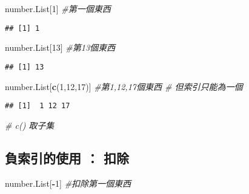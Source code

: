 \documentclass[]{article}
\newenvironment{Shaded}{\begin{snugshade}}{\end{snugshade}}
\newcommand{\CommentTok}[1]{\textcolor[rgb]{0.56,0.35,0.01}{\textit{#1}}}
\newcommand{\DecValTok}[1]{\textcolor[rgb]{0.00,0.00,0.81}{#1}}
\newcommand{\KeywordTok}[1]{\textcolor[rgb]{0.13,0.29,0.53}{\textbf{#1}}}
\newcommand{\NormalTok}[1]{#1}
\newcommand{\OperatorTok}[1]{\textcolor[rgb]{0.81,0.36,0.00}{\textbf{#1}}}
\begin{document}
\begin{Shaded}
\begin{Highlighting}[]
\NormalTok{number.List[}\DecValTok{1}\NormalTok{] }\CommentTok{#第一個東西}
\end{Highlighting}
\end{Shaded}

\begin{verbatim}
## [1] 1
\end{verbatim}

\begin{Shaded}
\begin{Highlighting}[]
\NormalTok{number.List[}\DecValTok{13}\NormalTok{] }\CommentTok{#第13個東西}
\end{Highlighting}
\end{Shaded}

\begin{verbatim}
## [1] 13
\end{verbatim}

\begin{Shaded}
\begin{Highlighting}[]
\NormalTok{number.List[}\KeywordTok{c}\NormalTok{(}\DecValTok{1}\NormalTok{,}\DecValTok{12}\NormalTok{,}\DecValTok{17}\NormalTok{)] }\CommentTok{#第1,12,17個東西 # 但索引只能為一個}
\end{Highlighting}
\end{Shaded}

\begin{verbatim}
## [1]  1 12 17
\end{verbatim}

\begin{Shaded}
\begin{Highlighting}[]
 \CommentTok{# c() 取子集}
\end{Highlighting}
\end{Shaded}

\hypertarget{ux8ca0ux7d22ux5f15ux7684ux4f7fux7528-ux6263ux9664}{%
\subsection{負索引的使用 ：
扣除}\label{ux8ca0ux7d22ux5f15ux7684ux4f7fux7528-ux6263ux9664}}

\begin{Shaded}
\begin{Highlighting}[]
\NormalTok{number.List[}\OperatorTok{-}\DecValTok{1}\NormalTok{] }\CommentTok{#扣除第一個東西}
\end{Highlighting}
\end{Shaded}
\end{document}

